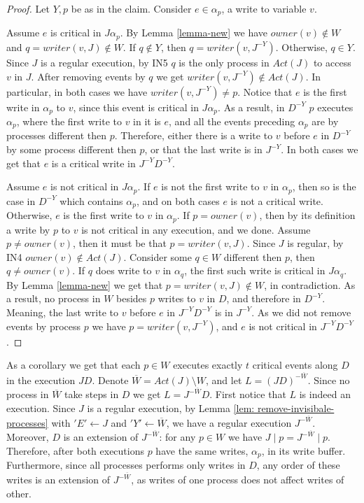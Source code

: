 \begin{proof}
	Let $Y,p$ be as in the claim. Consider $e \in \alpha_p$, a write to variable $v$. 
	
	Assume $e$ is critical in $J \alpha_p$. By Lemma \ref{lemma-new} we have $owner(v) \notin W$ and $q = writer(v,J) \notin W$. If $q \notin Y$, then $q = writer(v,J^{-Y})$. Otherwise, $q \in Y$. Since $J$ is a regular execution, by IN5 $q$ is the only process in $Act(J)$ to access $v$ in $J$. After removing events by $q$ we get $writer(v,J^{-Y}) \notin Act(J)$. In particular, in both cases we have $writer(v,J^{-Y}) \neq p$.
	Notice that $e$ is the first write in $\alpha_p$ to $v$, since this event is critical in $J \alpha_p$. As a result, in $D^{-Y}$ $p$ executes $\alpha_p$, where the first write to $v$ in it is $e$, and all the events preceding $\alpha_p$ are by processes different then $p$. Therefore, either there is a write to $v$ before $e$ in $D^{-Y}$ by some process different then $p$, or that the last write is in $J^{-Y}$. In both cases we get that $e$ is a critical write in $J^{-Y} D^{-Y}$.
	
	Assume $e$ is not critical in $J \alpha_p$. If $e$ is not the first write to $v$ in $\alpha_p$, then so is the case in $D^{-Y}$ which contains $\alpha_p$, and on both cases $e$ is not a critical write. Otherwise, $e$ is the first write to $v$ in $\alpha_p$.
	If $p = owner(v)$, then by its definition a write by $p$ to $v$ is not critical in any execution, and we done. Assume $p \neq owner(v)$, then it must be that $p = writer(v,J)$. Since $J$ is regular, by IN4 $owner(v) \notin Act(J)$. Consider some $q \in W$ different then $p$, then $q \neq owner(v)$. If $q$ does write to $v$ in $\alpha_q$, the first such write is critical in $J \alpha_q$. By Lemma \ref{lemma-new} we get that $p=writer(v,J) \notin W$, in contradiction. As a result, no process in $W$ besides $p$ writes to $v$ in $D$, and therefore in $D^{-Y}$. Meaning, the last write to $v$ before $e$ in $J^{-Y} D^{-Y}$ is in $J^{-Y}$. As we did not remove events by process $p$ we have $p = writer(v,J^{-Y})$, and $e$ is not critical in $J^{-Y} D^{-Y}$.
\end{proof}

As a corollary we get that each $p \in W$ executes exactly $t$ critical events along $D$ in the execution $J D$. Denote $\overline{W} = Act(J) \setminus W$, and let $L = (J D)^{-\overline{W}}$. Since no process in $\overline{W}$ take steps in $D$ we get $L = J^{-\overline{W}} D$.
First notice that $L$ is indeed an execution. Since $J$ is a regular execution, by Lemma \ref{lem: remove-invisibale-processes} with $'E' \leftarrow J$ and $'Y' \leftarrow \overline{W}$, we have a regular execution $J^{-\overline{W}}$. Moreover, $D$ is an extension of $J^{-\overline{W}}$: for any $p \in W$ we have $J \mid p = J^{-\overline{W}} \mid p$. Therefore, after both executions $p$ have the same writes, $\alpha_p$, in its write buffer. Furthermore, since all processes performs only writes in $D$, any order of these writes is an extension of $J^{-\overline{W}}$, as writes of one process does not affect writes of other.

